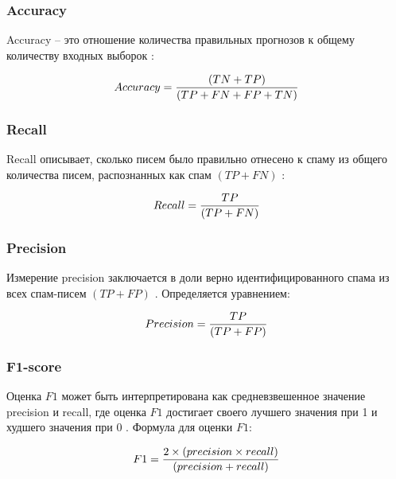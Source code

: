    \subsubsection{Accuracy}

        Accuracy -- это отношение количества правильных прогнозов к общему количеству входных
        выборок \cite{scikitMetrics}:

        \begin{equation}\label{eq11}
            Accuracy = {{(TN + TP)} \over{(TP + FN + FP + TN)}}
        \end{equation}

    \subsubsection{Recall}

        Recall описывает, сколько писем было правильно отнесено к спаму из
        общего количества писем, распознанных как спам $(TP + FN)$ \cite{scikitMetrics}:

        \begin{equation}\label{eq12}
            Recall = {{TP} \over{(TP + FN)}}
        \end{equation}

    \subsubsection{Precision}

        Измерение precision заключается в доли верно идентифицированного
        спама из всех спам-писем $(TP + FP)$ \cite{scikitMetrics}. Определяется
        уравнением:

        \begin{equation}\label{eq13}
            Precision = {{TP} \over{(TP + FP)}}
        \end{equation}

    \subsubsection{F1-score}

        Оценка $F1$ может быть интерпретирована как средневзвешенное
        значение precision и recall, где оценка $F1$ достигает своего лучшего
        значения при 1 и худшего значения при 0 \cite{scikitMetrics}.
        Формула для оценки $F1$:

        \begin{equation}\label{eq14}
            F1 = {2 \times (precision \times recall) \over{(precision + recall)}}
        \end{equation}


